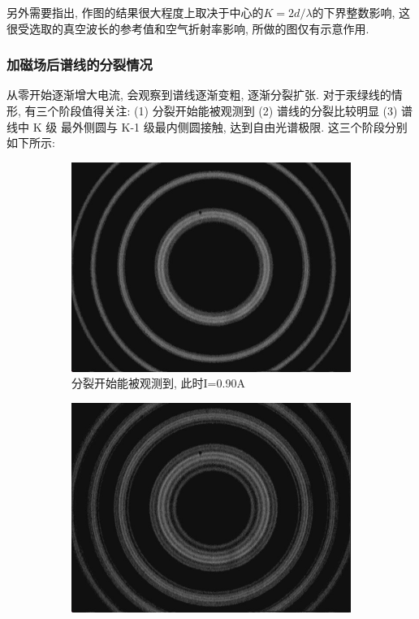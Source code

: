 \documentclass[12pt,a4paper]{article}
\begin{document}
另外需要指出, 作图的结果很大程度上取决于中心的$K=2d/\lambda$的下界整数影响, 这很受选取的真空波长的参考值和空气折射率影响, 所做的图仅有示意作用. 

\subsubsection{加磁场后谱线的分裂情况}
从零开始逐渐增大电流, 会观察到谱线逐渐变粗, 逐渐分裂扩张. 对于汞绿线的情
形, 有三个阶段值得关注: (1) 分裂开始能被观测到 (2) 谱线的分裂比较明显 (3) 谱线中 K 级
最外侧圆与 K-1 级最内侧圆接触, 达到自由光谱极限. 这三个阶段分别如下所示:
\begin{figure}[H]
    \centering
    \begin{subfigure}[b]{0.3\textwidth}
      \centering
      \includegraphics[width=\textwidth]{Multirings@0.90A.jpg}
      \caption{分裂开始能被观测到, 此时I=0.90A}
    \end{subfigure}
    \hfill
    \begin{subfigure}[b]{0.3\textwidth}
      \centering
      \includegraphics[width=\textwidth]{Multirings@2.55A.jpg}

\end{subfigure}
\end{figure}
\end{document}
